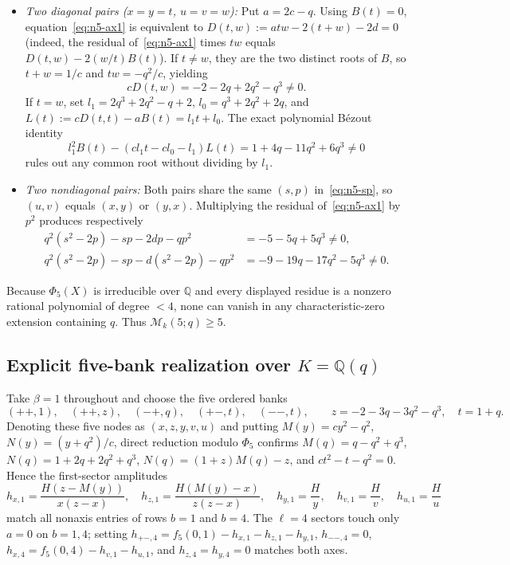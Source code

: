 \documentclass[11pt,reqno]{amsart}
\numberwithin{equation}{section}
\theoremstyle{definition}
\theoremstyle{remark}
\newcommand{\Q}{\mathbb{Q}}
\newcommand{\M}{\mathcal{M}}
\begin{document}
\begin{itemize}[leftmargin=1.5em]
\item \emph{Two diagonal pairs ($x=y=t$, $u=v=w$):} Put $a=2c-q$. Using $B(t)=0$, equation~\eqref{eq:n5-ax1} is equivalent to $D(t,w):=atw - 2(t+w) - 2d = 0$ (indeed, the residual of~\eqref{eq:n5-ax1} times $tw$ equals $D(t,w)-2(w/t)B(t)$). If $t\ne w$, they are the two distinct roots of $B$, so $t+w=1/c$ and $tw=-q^2/c$, yielding
\[
cD(t,w) = -2 - 2q + 2q^2 - q^3 \ne 0.
\]
If $t=w$, set $l_1=2q^3+2q^2-q+2$, $l_0=q^3+2q^2+2q$, and $L(t):=cD(t,t)-aB(t)=l_1 t + l_0$. The exact polynomial B\'ezout identity
\[
l_1^2 B(t) - (cl_1 t - cl_0 - l_1)L(t) = 1 + 4q - 11q^2 + 6q^3 \ne 0
\]
rules out any common root without dividing by $l_1$.
\item \emph{Two nondiagonal pairs:} Both pairs share the same $(s,p)$ in~\eqref{eq:n5-sp}, so $(u,v)$ equals $(x,y)$ or $(y,x)$. Multiplying the residual of~\eqref{eq:n5-ax1} by $p^2$ produces respectively
\begin{align*}
q^2(s^2-2p) - sp - 2dp - qp^2 &= -5 - 5q + 5q^3 \ne 0,\\
q^2(s^2-2p) - sp - d(s^2-2p) - qp^2 &= -9 - 19q - 17q^2 - 5q^3 \ne 0.
\end{align*}
\end{itemize}
Because $\Phi_5(X)$ is irreducible over $\Q$ and every displayed residue is a nonzero rational polynomial of degree $<4$, none can vanish in any characteristic-zero extension containing $q$. Thus $\M_k(5;q)\ge 5$.

\subsection{Explicit five-bank realization over $K=\Q(q)$}

Take $\beta=1$ throughout and choose the five ordered banks
\begin{equation}
\label{eq:n5-banks}
(++,1),\quad (++,z),\quad (-+,q),\quad (+-,t),\quad (--,t),
\qquad z = -2-3q-3q^2-q^3,\quad t = 1+q.
\end{equation}
Denoting these five nodes as $(x,z,y,v,u)$ and putting $M(y)=cy^2-q^2$, $N(y)=(y+q^2)/c$, direct reduction modulo $\Phi_5$ confirms $M(q)=q-q^2+q^3$, $N(q)=1+2q+2q^2+q^3$, $N(q)=(1+z)M(q)-z$, and $ct^2-t-q^2=0$. Hence the first-sector amplitudes
\[
h_{x,1} = \frac{H(z-M(y))}{x(z-x)},\quad
h_{z,1} = \frac{H(M(y)-x)}{z(z-x)},\quad
h_{y,1} = \frac{H}{y},\quad
h_{v,1} = \frac{H}{v},\quad
h_{u,1} = \frac{H}{u}
\]
match all nonaxis entries of rows $b=1$ and $b=4$. The $\ell=4$ sectors touch only $a=0$ on $b=1,4$; setting $h_{+-,4}=f_5(0,1)-h_{x,1}-h_{z,1}-h_{y,1}$, $h_{--,4}=0$, $h_{x,4}=f_5(0,4)-h_{v,1}-h_{u,1}$, and $h_{z,4}=h_{y,4}=0$ matches both axes.
\end{document}
